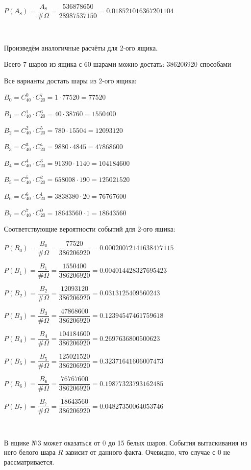 \begin{enumerate}
	$P(A_8) = \dfrac{A_8}{\# \Omega} = \dfrac{536878650}{28987537150} = 0.018521016367201104$
	
	~
	
	Произведём аналогичные расчёты для 2-ого ящика.
	
	Всего 7 шаров из ящика с 60 шарами можно достать: 386206920 способами
	
	Все варианты достать шары из 2-ого ящика:
	
	$B_0 = C_{40}^0 \cdot C_{20}^7 = 1 \cdot 77520 = 77520$
	
	$B_1 = C_{40}^1 \cdot C_{20}^6 = 40 \cdot 38760 = 1550400$
	
	$B_2 = C_{40}^2 \cdot C_{20}^5 = 780 \cdot 15504 = 12093120$
	
	$B_3 = C_{40}^3 \cdot C_{20}^4 = 9880 \cdot 4845 = 47868600$
	
	$B_4 = C_{40}^4 \cdot C_{20}^3 = 91390 \cdot 1140 = 104184600$
	
	$B_5 = C_{40}^5 \cdot C_{20}^2 = 658008 \cdot 190 = 125021520$
	
	$B_6 = C_{40}^6 \cdot C_{20}^1 = 3838380 \cdot 20 = 76767600$
	
	$B_7 = C_{40}^7 \cdot C_{20}^0 = 18643560 \cdot 1 = 18643560$
	
	Соответствующие вероятности событий для 2-ого ящика:
	
	$P(B_0) = \dfrac{B_0}{\# \Omega} = \dfrac{77520}{386206920} = 0.00020072141638477115$
	
	$P(B_1) = \dfrac{B_1}{\# \Omega} = \dfrac{1550400}{386206920} = 0.004014428327695423$
	
	$P(B_2) = \dfrac{B_2}{\# \Omega} = \dfrac{12093120}{386206920} = 0.0313125409560243$
	
	$P(B_3) = \dfrac{B_3}{\# \Omega} = \dfrac{47868600}{386206920} = 0.12394547461759618$
	
	$P(B_4) = \dfrac{B_4}{\# \Omega} = \dfrac{104184600}{386206920} = 0.2697636800500623$
	
	$P(B_5) = \dfrac{B_5}{\# \Omega} = \dfrac{125021520}{386206920} = 0.32371641606007473$
	
	$P(B_6) = \dfrac{B_6}{\# \Omega} = \dfrac{76767600}{386206920} = 0.19877323793162485$
	
	$P(B_7) = \dfrac{B_7}{\# \Omega} = \dfrac{18643560}{386206920} = 0.04827350064053746$
	
	~
	
	В ящике №3 может оказаться от 0 до 15 белых шаров. События вытаскивания из него белого шара $R$ зависит от данного факта. Очевидно, что случае с 0 не рассматривается.
	

\end{enumerate}
